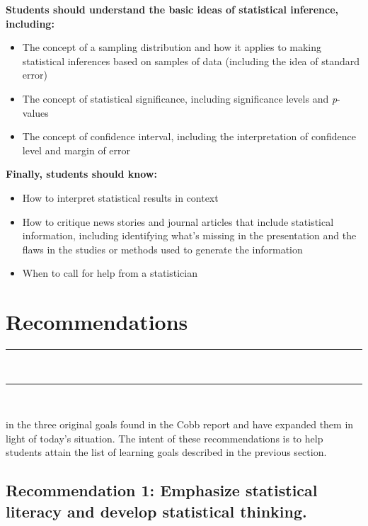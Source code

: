 \documentclass[twoside,openany]{tufte-book}
\begin{document}
\noindent\textbf{Students should understand the basic ideas of statistical inference, including:}
\begin{itemize}[leftmargin=1cm, itemsep=.2em]
\item The concept of a sampling distribution and how it applies to making statistical inferences based on samples of data (including the idea of standard error)
\item The concept of statistical significance, including significance levels and \textit{p}-values
\item The concept of confidence interval, including the interpretation of confidence level and margin of error
\end{itemize}

\newpage

\noindent\textbf{Finally, students should know:}
\begin{itemize}[leftmargin=1cm, itemsep=.2em]
\item How to interpret statistical results in context
\item How to critique news stories and journal articles that include statistical information, including identifying what's missing in the presentation and the flaws in the studies or methods used to generate the information
\item When to call for help from a statistician
\end{itemize}

\chapter{Recommendations}
\vspace{-.53in}
   \noindent\color{graylight}\rule[0cm]{3.25in}{0.03cm} \\
    \noindent\color{graylight}\rule[0.4cm]{3.25in}{0.03cm} \\
\color{black}
\vspace{.05in}
 
 in the three original goals found in the Cobb report\cite{cobb1} and have expanded them in light of today's situation. The intent of these recommendations is to help students attain the list of learning goals described in the previous section.
 
 
\section{\textbf{Recommendation 1: Emphasize statistical literacy and develop statistical thinking.}}
 
\end{document}

